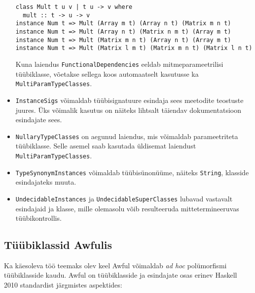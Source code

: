 \documentclass[12pt]{article}
\begin{document}
\begin{itemize}
            \begin{verbatim}class Mult t u v | t u -> v where
  mult :: t -> u -> v
instance Num t => Mult (Array m t) (Array n t) (Matrix m n t)
instance Num t => Mult (Array n t) (Matrix n m t) (Array m t)
instance Num t => Mult (Matrix m n t) (Array n t) (Array m t)
instance Num t => Mult (Matrix l m t) (Matrix m n t) (Matrix l n t)\end{verbatim}

            Kuna laiendus \verb!FunctionalDependencies! eeldab mitmeparameetrilisi tüübiklasse, võetakse sellega koos automaatselt kasutusse ka \verb!MultiParamTypeClasses!.
          \item
            \verb!InstanceSigs! võimaldab tüübisignatuure esindaja sees meetodite teostuste juures. Üks võimalik kasutus on näiteks lihtsalt täiendav dokumentatsioon esindajate sees.
          \item
            \verb!NullaryTypeClasses! on aegunud laiendus, mis võimaldab parameetriteta tüübiklasse. Selle asemel saab kasutada üldisemat laiendust \verb!MultiParamTypeClasses!.
          \item
            \verb!TypeSynonymInstances! võimaldab tüübisünonüüme, näiteks \verb!String!, klasside esindajateks muuta.
          \item
            \verb!UndecidableInstances! ja \verb!UndecidableSuperClasses! lubavad vastavalt esindajaid ja klasse, mille olemasolu võib resulteeruda mittetermineeruvas tüübikontrollis.
        \end{itemize}
    \subsection{Tüübiklassid Awfulis}\label{tyybiklassidawfulis}
      Ka käesoleva töö teemaks olev keel Awful võimaldab \textit{ad hoc} polümorfismi tüübiklasside kaudu. Awful on tüübiklasside ja esindajate osas erinev Haskell 2010 standardist järgmistes aspektides:
\end{document}
